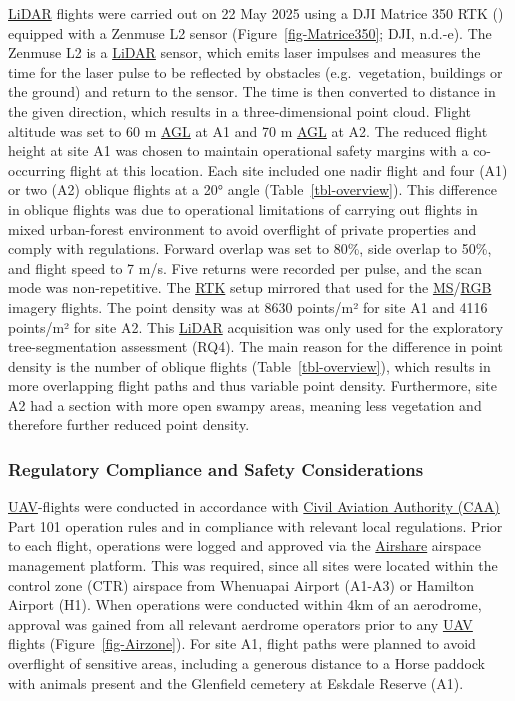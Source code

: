 \documentclass[
]{scrreprt}
\begin{document}
\hyperref[acronyms_LiDAR]{LiDAR} flights were carried out on 22 May 2025
using a DJI Matrice 350 RTK ()
equipped with a Zenmuse L2 sensor (Figure~\ref{fig-Matrice350}; DJI,
n.d.-e). The Zenmuse L2 is a \hyperref[acronyms_LiDAR]{LiDAR} sensor,
which emits laser impulses and measures the time for the laser pulse to
be reflected by obstacles (e.g.~vegetation, buildings or the ground) and
return to the sensor. The time is then converted to distance in the
given direction, which results in a three-dimensional point cloud.
Flight altitude was set to 60 m \hyperref[acronyms_AGL]{AGL} at A1 and
70 m \hyperref[acronyms_AGL]{AGL} at A2. The reduced flight height at
site A1 was chosen to maintain operational safety margins with a
co-occurring flight at this location. Each site included one nadir
flight and four (A1) or two (A2) oblique flights at a 20° angle
(Table~\ref{tbl-overview}). This difference in oblique flights was due
to operational limitations of carrying out flights in mixed urban-forest
environment to avoid overflight of private properties and comply with
regulations. Forward overlap was set to 80\%, side overlap to 50\%, and
flight speed to 7 m/s. Five returns were recorded per pulse, and the
scan mode was non-repetitive. The \hyperref[acronyms_RTK]{RTK} setup
mirrored that used for the
\hyperref[acronyms_MS]{MS}/\hyperref[acronyms_RGB]{RGB} imagery flights.
The point density was at 8630 points/m² for site A1 and 4116 points/m²
for site A2. This \hyperref[acronyms_LiDAR]{LiDAR} acquisition was only
used for the exploratory tree-segmentation assessment (RQ4). The main
reason for the difference in point density is the number of oblique
flights (Table~\ref{tbl-overview}), which results in more overlapping
flight paths and thus variable point density. Furthermore, site A2 had a
section with more open swampy areas, meaning less vegetation and
therefore further reduced point density.

\subsubsection{Regulatory Compliance and Safety
Considerations}\label{regulatory-compliance-and-safety-considerations}

\hyperref[acronyms_UAV]{UAV}-flights were conducted in accordance with
\hyperref[acronyms_CAA]{Civil Aviation Authority (CAA)} Part 101
operation rules and in compliance with relevant local regulations. Prior
to each flight, operations were logged and approved via the
\href{https://pilot.airshare-utm.io/info}{Airshare} airspace management
platform. This was required, since all sites were located within the
control zone (CTR) airspace from Whenuapai Airport (A1-A3) or Hamilton
Airport (H1). When operations were conducted within 4km of an aerodrome,
approval was gained from all relevant aerdrome operators prior to any
\hyperref[acronyms_UAV]{UAV} flights (Figure~\ref{fig-Airzone}). For
site A1, flight paths were planned to avoid overflight of sensitive
areas, including a generous distance to a Horse paddock with animals
present and the Glenfield cemetery at Eskdale Reserve (A1).
\end{document}
